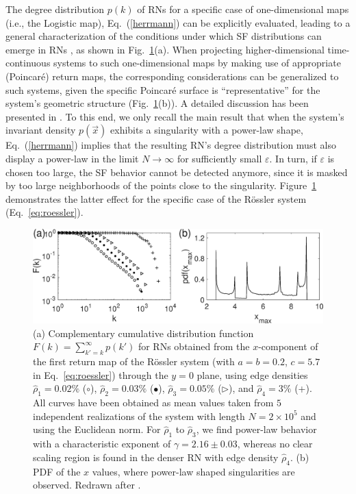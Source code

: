 		The degree distribution $p(k)$ of RNs for a specific case of one-dimensional maps (i.e., the Logistic map), Eq.~(\ref{herrmann}) can be explicitly evaluated, leading to a general characterization of the conditions under which SF distributions can emerge in RNs \cite{Zou2010}, as shown in Fig.~\ref{fig:roessler_scaling}(a). When projecting higher-dimensional time-continuous systems to such one-dimensional maps by making use of appropriate (Poincar\'e) return maps, the corresponding considerations can be generalized to such systems, given the specific Poincar\'e surface is ``representative'' for the system's geometric structure (Fig.~\ref{fig:roessler_scaling}(b)). A detailed discussion has been presented in \cite{Zou2012}. To this end,  we only recall the main result that when the system's invariant density $p(\vec{x})$ exhibits a singularity with a power-law shape, Eq.~(\ref{herrmann}) implies that the resulting RN's degree distribution must also display a power-law in the limit $N\to\infty$ for sufficiently small $\varepsilon$. In turn, if $\varepsilon$ is chosen too large, the SF behavior cannot be detected anymore, since it is masked by too large neighborhoods of the points close to the singularity. Figure~\ref{fig:roessler_scaling} demonstrates the latter effect for the specific case of the R\"ossler system (Eq.~\ref{eq:roessler}).
\begin{figure}
	\centering
	\includegraphics[width=\columnwidth]{Chapter03_RecurrenceNt/retmap_histP.eps}
	\caption{(a) Complementary cumulative distribution function $F(k)=\sum_{k'=k}^{\infty} p(k')$ for RNs obtained from the $x$-component of the first return map of the R\"ossler system (with $a=b=0.2$, $c=5.7$ in Eq.~\eqref{eq:roessler}) through the $y=0$ plane, using edge densities $\hat{\rho}_1 =0.02\%$ ($\circ$), $\hat{\rho}_2 =0.03\%$ ($\bullet$), $\hat{\rho}_3 =0.05\%$ ($\triangleright$), and $\hat{\rho}_4 =3\%$ (+). All curves have been obtained as mean values taken from $5$ independent realizations of the system with length $N=2\times 10^5$ and using the Euclidean norm. For $\hat{\rho}_1$ to $\hat{\rho}_3$, we find power-law behavior with a characteristic exponent of $\gamma=2.16\pm 0.03$, whereas no clear scaling region is found in the denser RN with edge density $\hat{\rho}_4$. (b) PDF of the $x$ values, where power-law shaped singularities are observed. Redrawn after \cite{Zou2012}.}
\label{fig:roessler_scaling}
\end{figure}

